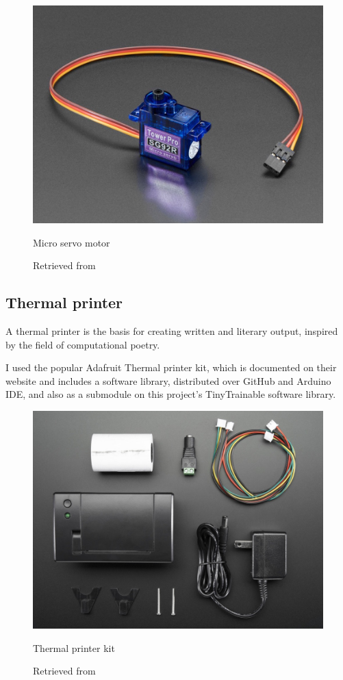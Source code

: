 \begin{figure}[ht]
  \centering
  \includegraphics[width=0.75\linewidth,height=0.25\textheight,keepaspectratio]{images/materials-adafruit-servo.jpg}
  \caption{Micro servo motor}
  \caption*{Retrieved from \cite{website-materials-adafruit-servo}}
  \label{fig:materials-adafruit-servo}
\end{figure}

\subsection{Thermal printer}

A thermal printer is the basis for creating written and literary output, inspired by the field of computational poetry.

I used the popular Adafruit Thermal printer kit, which is documented on their website and includes a software library, distributed over GitHub and Arduino IDE, and also as a submodule on this project's TinyTrainable software library.

\begin{figure}[ht]
  \centering
  \includegraphics[width=0.75\linewidth,height=0.25\textheight,keepaspectratio]{images/materials-adafruit-thermal-printer.jpg}
  \caption{Thermal printer kit}
  \caption*{Retrieved from \cite{website-materials-adafruit-thermal-printer}}
  \label{fig:materials-adafruit-thermal-printer}
\end{figure}

